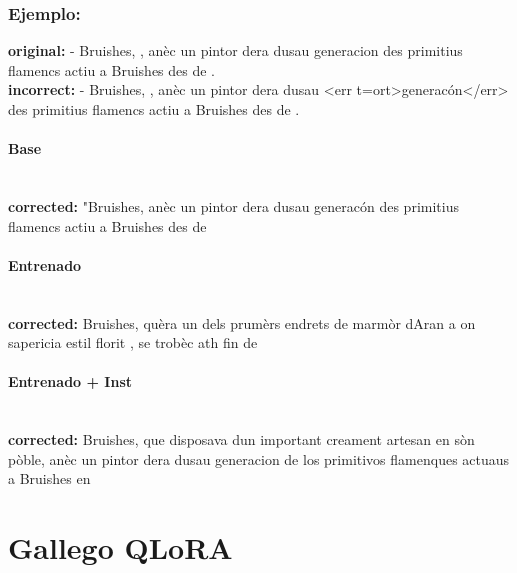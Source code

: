 \subsubsection{Ejemplo:}
\textbf{original:} - Bruishes, , anèc un pintor dera dusau generacion des primitius flamencs actiu a Bruishes des de .\\
\textbf{incorrect:} - Bruishes, , anèc un pintor dera dusau {\textless}err t=ort{\textgreater}generacón{\textless}/err{\textgreater} des primitius flamencs actiu a Bruishes des de .

\paragraph{Base}~\\
\textbf{corrected:} "Bruishes, anèc un pintor dera dusau generacón des primitius flamencs actiu a Bruishes des de

\paragraph{Entrenado}~\\
\textbf{corrected:} Bruishes, qu\textquotesingle{}èra un dels prumèrs endrets de marmòr d\textquotesingle{}Aran a on s\textquotesingle{}apericia estil florit , se trobèc ath fin de

\paragraph{Entrenado + Inst}~\\
\textbf{corrected:} Bruishes, que disposava d\textquotesingle{}un important creament artesan en sòn pòble, anèc un pintor dera dusau generacion de los primitivos flamenques actuaus a Bruishes en

\vspace{1em}

\section{Gallego QLoRA}

